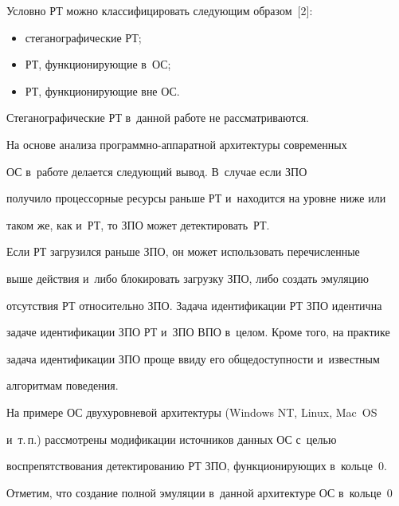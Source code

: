   


  Условно РТ можно классифицировать следующим образом~[2]:


  \begin{itemize}


\item стеганографические РТ;


\item РТ, функционирующие в~ОС;


\item РТ, функционирующие вне ОС.


  \end{itemize}


  


  Стеганографические РТ в~данной работе не рассматриваются.


  


  На основе анализа программно-аппаратной архитектуры современных 


ОС в~работе делается следующий вывод. В~случае если ЗПО 


получило процессорные ресурсы раньше РТ и~находится на уровне ниже или 


таком же, как и~РТ, то ЗПО может детектировать~РТ.


  


  Если РТ загрузился раньше ЗПО, он может использовать перечисленные 


выше действия и~либо блокировать загрузку ЗПО, либо создать эмуляцию 


отсутствия РТ относительно ЗПО. Задача идентификации РТ ЗПО идентична 


задаче идентификации ЗПО РТ и~ЗПО ВПО в~целом. Кроме того, на практике 


задача идентификации ЗПО проще ввиду его общедоступности и~известным 


алгоритмам поведения.


  


  На примере ОС двухуровневой архитектуры (Windows NT, Linux, Mac~OS 


и~т.\,п.) рассмотрены модификации источников данных ОС с~целью 


воспрепятствования детектированию РТ ЗПО, функционирующих в~кольце~0. 


Отметим, что создание полной эмуляции в~данной архитектуре ОС в~кольце~0 



